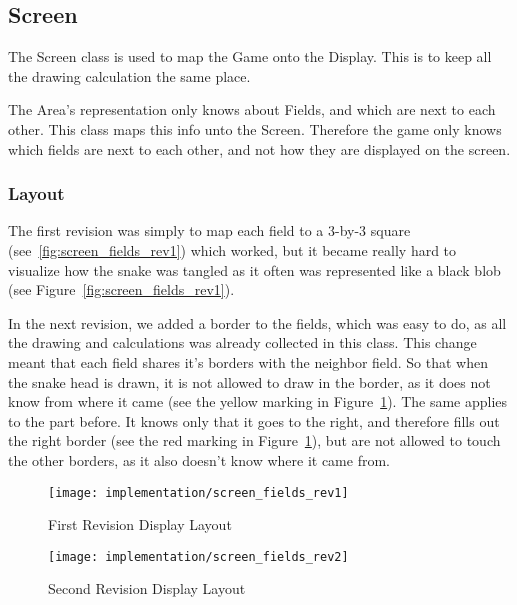 \subsection{Screen}

The Screen class is used to map the Game onto the Display. This is to keep all the drawing calculation the same place.

The Area's representation only knows about Fields, and which are next to each other. This class maps this info unto the Screen. Therefore the game only knows which fields are next to each other, and not how they are displayed on the screen.

\subsubsection{Layout}

The first revision was simply to map each field to a 3-by-3 square (see~\ref{fig:screen_fields_rev1}) which worked, but it became really hard to visualize how the snake was tangled as it often was represented like a black blob (see Figure~\ref{fig:screen_fields_rev1}). 

In the next revision, we added a border to the fields, which was easy to do, as all the drawing and calculations was already collected in this class. This change meant that each field shares it's borders with the neighbor field. So that when the snake head is drawn, it is not allowed to draw in the border, as it does not know from where it came (see the yellow marking in Figure~\ref{fig:screen_fields_rev2}). The same applies to the part before. It knows only that it goes to the right, and therefore fills out the right border (see the red marking in Figure~\ref{fig:screen_fields_rev2}), but are not allowed to touch the other borders, as it also doesn't know where it came from.

\begin{figure}
\centering
\begin{minipage}{.5\textwidth}
  \centering
	\texttt{[image: implementation/screen\_fields\_rev1]}
	\caption{First Revision Display Layout}
	\label{fig:screen_fields_rev1}
\end{minipage}%
\begin{minipage}{.5\textwidth}
  \centering
	\texttt{[image: implementation/screen\_fields\_rev2]}
	\caption{Second Revision Display Layout}
	\label{fig:screen_fields_rev2}
\end{minipage}
\end{figure}

